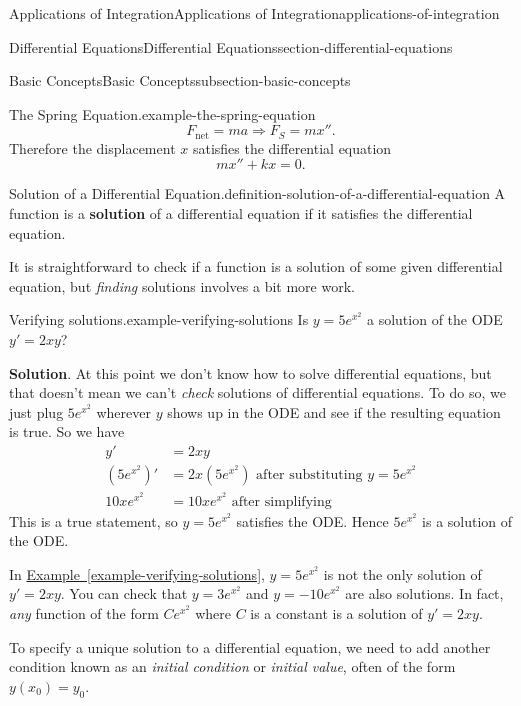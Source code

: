 \documentclass[oneside,10pt,]{book}
\newcommand{\terminology}[1]{\textbf{#1}}
\numberwithin{equation}{section}
\begin{document}
\begin{chapterptx}{Applications of Integration}{}{Applications of Integration}{}{}{applications-of-integration}
\begin{sectionptx}{Differential Equations}{}{Differential Equations}{}{}{section-differential-equations}
\begin{subsectionptx}{Basic Concepts}{}{Basic Concepts}{}{}{subsection-basic-concepts}
\begin{example}{The Spring Equation.}{example-the-spring-equation}
\begin{equation*}
F_{\text{net}} = ma \Rightarrow F_{S} = mx''.
\end{equation*}
Therefore the displacement \(x\) satisfies the differential equation%
\begin{equation*}
mx'' + kx = 0.
\end{equation*}
%
\end{example}
\begin{definition}{Solution of a Differential Equation.}{definition-solution-of-a-differential-equation}%
\hypertarget{p-722}{}%
A function is a \terminology{solution} of a differential equation if it satisfies the differential equation.%
\end{definition}
\hypertarget{p-723}{}%
It is straightforward to check if a function is a solution of some given differential equation, but \emph{finding} solutions involves a bit more work.%
\begin{example}{Verifying solutions.}{example-verifying-solutions}%
\hypertarget{p-724}{}%
Is \(y = 5e^{x^{2}}\) a solution of the ODE \(y' = 2xy\)?%
\par\smallskip%
\noindent\textbf{Solution}.\hypertarget{solution-153}{}\quad%
\hypertarget{p-725}{}%
At this point we don't know how to solve differential equations, but that doesn't mean we can't \emph{check} solutions of differential equations. To do so, we just plug \(5e^{x^{2}}\) wherever \(y\) shows up in the ODE and see if the resulting equation is true. So we have%
\begin{align*}
y' & = 2xy \\
(5e^{x^{2}})' & = 2x(5e^{x^{2}}) \text{ after substituting }y = 5e^{x^{2}}\\
10xe^{x^{2}} & = 10xe^{x^{2}} \text{ after simplifying} 
\end{align*}
This is a true statement, so \(y = 5e^{x^{2}}\) satisfies the ODE. Hence \(5e^{x^{2}}\) is a solution of the ODE.%
\end{example}
\hypertarget{p-726}{}%
In \hyperref[example-verifying-solutions]{Example~\ref{example-verifying-solutions}}, \(y = 5e^{x^{2}}\) is not the only solution of \(y' = 2xy\). You can check that \(y = 3e^{x^{2}}\) and \(y = -10e^{x^{2}}\) are also solutions. In fact, \emph{any} function of the form \(Ce^{x^{2}}\) where \(C\) is a constant is a solution of \(y' = 2xy\).%
\par
\hypertarget{p-727}{}%
To specify a unique solution to a differential equation, we need to add another condition known as an \emph{initial condition} or \emph{initial value}, often of the form \(y(x_{0}) = y_{0}\).%

\end{subsectionptx}
\end{sectionptx}
\end{chapterptx}
\end{document}
